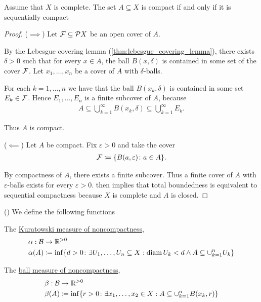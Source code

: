 \begin{theorem}\label{thm:metric_compact_iff_sequentially_compact}
  Assume that $X$ is complete. The set $A \subseteq X$ is compact if and only if it is sequentially compact
\end{theorem}
\begin{proof}
  ($\implies$) Let $\mathcal{F} \subseteq \mathcal{P} X$ be an open cover of $A$.

  By the Lebesgue covering lemma (\cref{thm:lebesgue_covering_lemma}), there exists $\delta > 0$ such that for every $x \in A$, the ball $B(x, \delta)$ is contained in some set of the cover $\mathcal{F}$. Let $x_1, \ldots, x_n$ be a cover of $A$ with $\delta$-balls.

  For each $k = 1, \ldots, n$ we have that the ball $B(x_k, \delta)$ is contained in some set $E_k \in \mathcal{F}$. Hence $E_1, \ldots, E_n$ is a finite subcover of $A$, because
  \begin{align*}
    A \subseteq \bigcup_{k=1}^\infty B(x_k, \delta) \subseteq \bigcup_{k=1}^\infty E_k.
  \end{align*}

  Thus $A$ is compact.

  ($\impliedby$) Let $A$ be compact. Fix $\varepsilon > 0$ and take the cover
  \begin{align*}
    \mathcal{F} \coloneqq \{ B(a, \varepsilon) \colon a \in A \}.
  \end{align*}

  By compactness of $A$, there exists a finite subcover. Thus a finite cover of $A$ with $\varepsilon$-balls exists for every $\varepsilon > 0$.  then implies that total boundedness is equivalent to sequential compactness because $X$ is complete and $A$ is closed.
\end{proof}

\begin{definition}\label{def:noncompactness_measures}(\cite[definition 7.1]{Deimling1985})
  We define the following functions
  \begin{defenum}
    \item\label{def:noncompactness_measures/sets} The \uline{Kuratowski measure of noncompactness},
    \begin{align*}
      &\alpha: \mathcal{B} \to \mathbb{R}^{>0} \\
      &\alpha(A) \coloneqq \inf \{d > 0 \colon \exists U_1, \ldots, U_n \subseteq X: \operatorname{diam} {U_k} < d \land A \subseteq \cup_{k=1}^n U_k \}
    \end{align*}

    \item\label{def:noncompactness_measures/balls} The \uline{ball measure of noncompactness},
    \begin{align*}
      &\beta: \mathcal{B} \to \mathbb{R}^{>0} \\
      &\beta(A) \coloneqq \inf \{r > 0 \colon \exists x_1, \ldots, x_2 \in X: A \subseteq \cup_{k=1}^n B(x_k, r) \}
    \end{align*}
  \end{defenum}
\end{definition}

